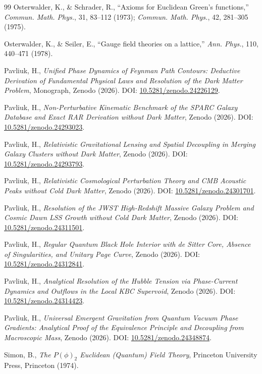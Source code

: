 \documentclass[11pt, a4paper]{article}
\theoremstyle{definition}
\theoremstyle{remark}
\begin{document}
\begin{thebibliography}{99}
Osterwalder, K., \& Schrader, R., ``Axioms for Euclidean Green's functions,'' \textit{Commun. Math. Phys.}, 31, 83--112 (1973); \textit{Commun. Math. Phys.}, 42, 281--305 (1975).

Osterwalder, K., \& Seiler, E., ``Gauge field theories on a lattice,'' \textit{Ann. Phys.}, 110, 440--471 (1978).

Pavliuk, H., \textit{Unified Phase Dynamics of Feynman Path Contours: Deductive Derivation of Fundamental Physical Laws and Resolution of the Dark Matter Problem}, Monograph, Zenodo (2026). DOI: \href{https://doi.org/10.5281/zenodo.24226129}{10.5281/zenodo.24226129}.

Pavliuk, H., \textit{Non-Perturbative Kinematic Benchmark of the SPARC Galaxy Database and Exact RAR Derivation without Dark Matter}, Zenodo (2026). DOI: \href{https://doi.org/10.5281/zenodo.24293023}{10.5281/zenodo.24293023}.

Pavliuk, H., \textit{Relativistic Gravitational Lensing and Spatial Decoupling in Merging Galaxy Clusters without Dark Matter}, Zenodo (2026). DOI: \href{https://doi.org/10.5281/zenodo.24293793}{10.5281/zenodo.24293793}.

Pavliuk, H., \textit{Relativistic Cosmological Perturbation Theory and CMB Acoustic Peaks without Cold Dark Matter}, Zenodo (2026). DOI: \href{https://doi.org/10.5281/zenodo.24301701}{10.5281/zenodo.24301701}.

Pavliuk, H., \textit{Resolution of the JWST High-Redshift Massive Galaxy Problem and Cosmic Dawn LSS Growth without Cold Dark Matter}, Zenodo (2026). DOI: \href{https://doi.org/10.5281/zenodo.24311501}{10.5281/zenodo.24311501}.

Pavliuk, H., \textit{Regular Quantum Black Hole Interior with de Sitter Core, Absence of Singularities, and Unitary Page Curve}, Zenodo (2026). DOI: \href{https://doi.org/10.5281/zenodo.24312841}{10.5281/zenodo.24312841}.

Pavliuk, H., \textit{Analytical Resolution of the Hubble Tension via Phase-Current Dynamics and Outflows in the Local KBC Supervoid}, Zenodo (2026). DOI: \href{https://doi.org/10.5281/zenodo.24314423}{10.5281/zenodo.24314423}.

Pavliuk, H., \textit{Universal Emergent Gravitation from Quantum Vacuum Phase Gradients: Analytical Proof of the Equivalence Principle and Decoupling from Macroscopic Mass}, Zenodo (2026). DOI: \href{https://doi.org/10.5281/zenodo.24348874}{10.5281/zenodo.24348874}.

Simon, B., \textit{The $P(\phi)_{2}$ Euclidean (Quantum) Field Theory}, Princeton University Press, Princeton (1974).

\end{thebibliography}
\end{document}
